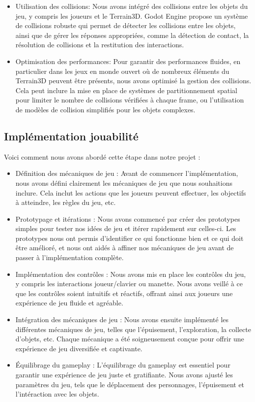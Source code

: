 \documentclass[
	article,			%
	11pt,				%
	oneside,			%
	a4paper,			%
	chapter=TITLE,
	french,			%
	sumario=tradicional
	]{base_nt}
\begin{document}
\begin{itemize}
    \item Utilisation des collisions: Nous avons intégré des collisions entre les objets du jeu, y compris les joueurs et le Terrain3D. Godot Engine propose un système de collisions robuste qui permet de détecter les collisions entre les objets, ainsi que de gérer les réponses appropriées, comme la détection de contact, la résolution de collisions et la restitution des interactions.
    \item Optimisation des performances: Pour garantir des performances fluides, en particulier dans les jeux en monde ouvert où de nombreux éléments du Terrain3D peuvent être présents, nous avons optimisé la gestion des collisions. Cela peut inclure la mise en place de systèmes de partitionnement spatial pour limiter le nombre de collisions vérifiées à chaque frame, ou l'utilisation de modèles de collision simplifiés pour les objets complexes.
\end{itemize}

\subsection{Implémentation jouabilité}

Voici comment nous avons abordé cette étape dans notre projet :

\begin{itemize}
    \item Définition des mécaniques de jeu : Avant de commencer l'implémentation, nous avons défini clairement les mécaniques de jeu que nous souhaitions inclure. Cela inclut les actions que les joueurs peuvent effectuer, les objectifs à atteindre, les règles du jeu, etc.
    \item Prototypage et itérations : Nous avons commencé par créer des prototypes simples pour tester nos idées de jeu et itérer rapidement sur celles-ci. Les prototypes nous ont permis d'identifier ce qui fonctionne bien et ce qui doit être amélioré, et nous ont aidés à affiner nos mécaniques de jeu avant de passer à l'implémentation complète.
    \item Implémentation des contrôles : Nous avons mis en place les contrôles du jeu, y compris les interactions joueur/clavier ou manette. Nous avons veillé à ce que les contrôles soient intuitifs et réactifs, offrant ainsi aux joueurs une expérience de jeu fluide et agréable.
    \item Intégration des mécaniques de jeu : Nous avons ensuite implémenté les différentes mécaniques de jeu, telles que l'épuisement, l'exploration, la collecte d'objets, etc. Chaque mécanique a été soigneusement conçue pour offrir une expérience de jeu diversifiée et captivante.
    \item Équilibrage du gameplay : L'équilibrage du gameplay est essentiel pour garantir une expérience de jeu juste et gratifiante. Nous avons ajusté les paramètres du jeu, tels que le déplacement des personnages, l'épuisement et l'intéraction avec les objets.
\end{itemize}
\end{document}
